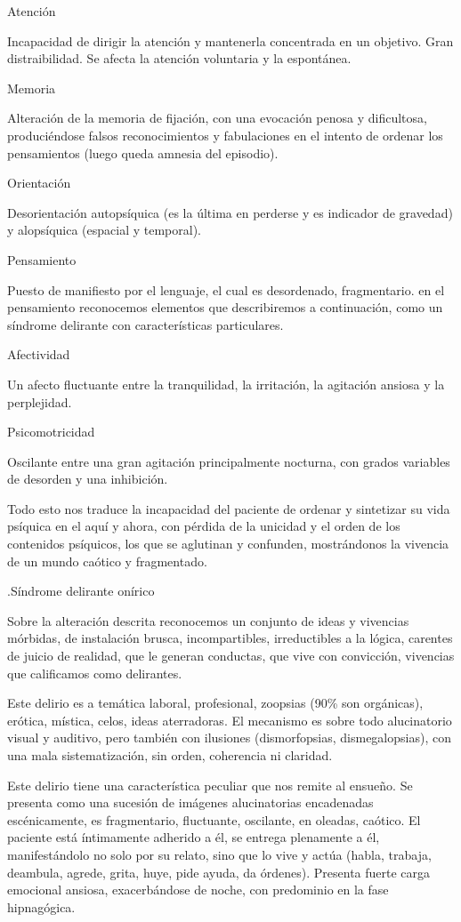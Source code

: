 Atención

Incapacidad de dirigir la atención y mantenerla concentrada en un objetivo. Gran distraibilidad. Se afecta la atención voluntaria y la espontánea.

Memoria

Alteración de la memoria de fijación, con una evocación penosa y dificultosa, produciéndose falsos reconocimientos y fabulaciones en el intento de ordenar los pensamientos (luego queda amnesia del episodio).

Orientación

Desorientación autopsíquica (es la última en perderse y es indicador de gravedad) y alopsíquica (espacial y temporal).

Pensamiento

Puesto de manifiesto por el lenguaje, el cual es desordenado, fragmentario. en el pensamiento reconocemos elementos que describiremos a continuación, como un síndrome delirante con características particulares.

Afectividad

Un afecto fluctuante entre la tranquilidad, la irritación, la agitación ansiosa y la perplejidad.

Psicomotricidad

Oscilante entre una gran agitación principalmente nocturna, con grados variables de desorden y una inhibición.

Todo esto nos traduce la incapacidad del paciente de ordenar y sintetizar su vida psíquica en el aquí y ahora, con pérdida de la unicidad y el orden de los contenidos psíquicos, los que se aglutinan y confunden, mostrándonos la vivencia de un mundo caótico y fragmentado.

.Síndrome delirante onírico

Sobre la alteración descrita reconocemos un conjunto de ideas y vivencias mórbidas, de instalación brusca, incompartibles, irreductibles a la lógica, carentes de juicio de realidad, que le generan conductas, que vive con convicción, vivencias que calificamos como delirantes.

Este delirio es a temática laboral, profesional, zoopsias (90\% son orgánicas), erótica, mística, celos, ideas aterradoras. El mecanismo es sobre todo alucinatorio visual y auditivo, pero también con ilusiones (dismorfopsias, dismegalopsias), con una mala sistematización, sin orden, coherencia ni claridad.

Este delirio tiene una característica peculiar que nos remite al ensueño. Se presenta como una sucesión de imágenes alucinatorias encadenadas escénicamente, es fragmentario, fluctuante, oscilante, en oleadas, caótico. El paciente está íntimamente adherido a él, se entrega plenamente a él, manifestándolo no solo por su relato, sino que lo vive y actúa (habla, trabaja, deambula, agrede, grita, huye, pide ayuda, da órdenes). Presenta fuerte carga emocional ansiosa, exacerbándose de noche, con predominio en la fase hipnagógica.

